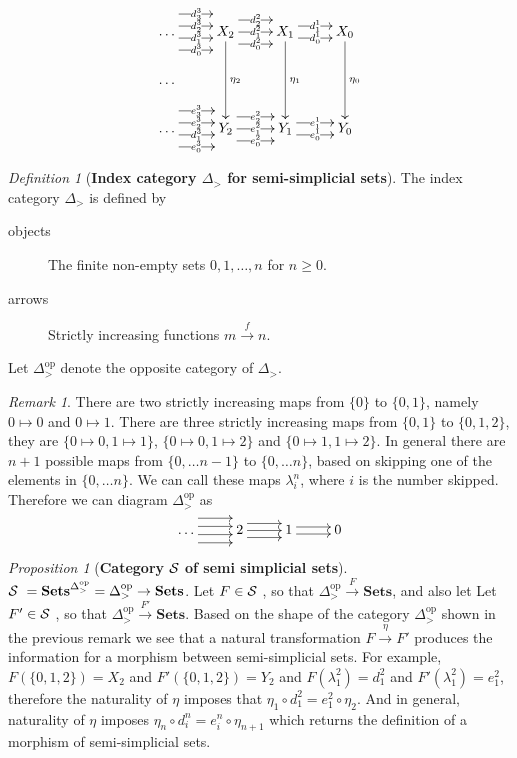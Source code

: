 \documentclass[10pt]{article}
\newcommand{\onearrow}[3]{\mbox{$#1 \stackrel{#2}{\longrightarrow} #3$}}
\newcommand{\calS}{\mbox{${\cal S}\ $}}
\theoremstyle{remark}
\newtheorem{definition}{Definition}
\newtheorem{proposition}{Proposition}
\newtheorem{remark}{Remark}
\begin{document}
$$
\xymatrix{
\ldots \ar@<3ex>[r]|{d_3^3}  \ar@<1 ex>[r]|{d_2^3}  \ar@<-1ex>[r]|{d_1^3}  \ar@<-3 ex>[r]|{d_0^3} &
     X_2 \ar@<2ex>[r]|{d_2^2}  \ar[r]|{d_1^2} \ar@<-2 ex>[r]|{d_0^2} \ar[dd]^{\eta_2} &
     X_1 \ar@<1ex>[r]|{d_1^1} \ar@<-1ex>[r]|{d_0^1} \ar[dd]^{\eta_1} &
     X_0 \ar[dd]^{\eta_0} \\
\ldots     \\
  \ldots \ar@<3ex>[r]|{e_3^3}  \ar@<1 ex>[r]|{e_2^3}  \ar@<-1ex>[r]|{d_1^3}  \ar@<-3 ex>[r]|{e_0^3} &
     Y_2 \ar@<2ex>[r]|{e_2^2}  \ar[r]|{e_1^2} \ar@<-2 ex>[r]|{e_0^2} &
     Y_1 \ar@<1ex>[r]|{e_1^1} \ar@<-1ex>[r]|{e_0^1} &
     Y_0
}
$$

\begin{definition}[\textbf{Index category $\Delta_{>}$ for semi-simplicial sets}]
The index category $\Delta_{>}$ is defined by
\begin{description}
\item [objects] The finite non-empty sets ${0,1, \ldots , n}$ for $n \geq 0$.
\item [arrows] Strictly increasing functions \onearrow{m}{f}{n}.
\end{description}
Let $\Delta_{>}^{\text{op}}$ denote the opposite category of $\Delta_{>}$.
\end{definition}

\begin{remark}
There are two strictly increasing maps from $\{0\}$ to $\{0, 1\}$, namely $0 \mapsto 0$ and $0 \mapsto 1$. There are three strictly increasing maps from $\{0, 1\}$ to $\{0, 1, 2\}$, they are $\{ 0 \mapsto 0, 1 \mapsto 1\}$, $\{ 0 \mapsto 0, 1 \mapsto 2\}$ and $\{ 0 \mapsto 1, 1 \mapsto 2\}$. In general there are $n+1$ possible maps from $\{0, \ldots n-1\}$ to $\{0, \ldots n \}$, based on skipping one of the elements in $\{0, \ldots n \}$. We can call these maps $\lambda^n_i$, where $i$ is the number skipped. Therefore we can diagram $\Delta_{>}^{\text{op}}$ as
$$
\xymatrix{
\ldots \ar@<2.1ex>[r]  \ar@<0.7 ex>[r]  \ar@<-0.7ex>[r]  \ar@<-2.1 ex>[r] &
     2 \ar@<1.2ex>[r]  \ar[r] \ar@<-1.2 ex>[r] &
     1 \ar@<0.6ex>[r] \ar@<-0.6ex>[r] &
     0
}
$$
\end{remark}

\begin{proposition}[\textbf{Category \calS of semi simplicial sets}]
$\calS = \mathbf{Sets}^{\Delta_{>}^{\text{op}}} = \Delta_{>}^{\text{op}} \rightarrow \mathbf{Sets}$. Let $F \in \calS$,
so that \onearrow{ \Delta_{>}^{\text{op}}}{F}{\mathbf{Sets}}, and also let Let $F' \in \calS$,
so that \onearrow{ \Delta_{>}^{\text{op}}}{F'}{\mathbf{Sets}}.
Based on the shape of the category $\Delta_{>}^{\text{op}}$ shown in the previous remark we see that a natural transformation \onearrow{F}{\eta}{F'} produces the information for a morphism between semi-simplicial sets.
For example, $F(\{0,1,2\}) = X_2$ and $F'(\{0,1,2\}) = Y_2$ and $F(\lambda^2_1) = d^2_1$ and $F'(\lambda^2_1) = e^2_1$, therefore the naturality of $\eta$ imposes that $\eta_1 \circ  d^2_1 = e^2_1 \circ \eta_2$.
And in general, naturality of $\eta$ imposes $\eta_n \circ  d^n_i = e^n_i \circ \eta_{n+1}$
which returns the definition of a morphism of semi-simplicial sets.
\end{proposition}
\end{document}
